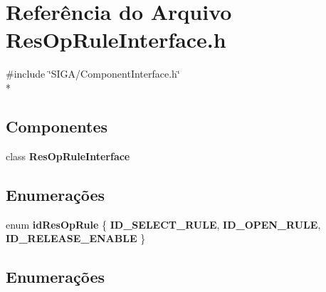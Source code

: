 \section{Referência do Arquivo Res\+Op\+Rule\+Interface.\+h}
\label{_rule_2_res_op_rule_interface_8h}
{\ttfamily \#include \char`\"{}S\+I\+G\+A/\+Component\+Interface.\+h\char`\"{}}\\*
\subsection*{Componentes}
\begin{DoxyCompactItemize}
\item 
class {\bf Res\+Op\+Rule\+Interface}
\end{DoxyCompactItemize}
\subsection*{Enumerações}
\begin{DoxyCompactItemize}
\item 
enum {\bf id\+Res\+Op\+Rule} \{ {\bf I\+D\+\_\+\+S\+E\+L\+E\+C\+T\+\_\+\+R\+U\+LE}, 
{\bf I\+D\+\_\+\+O\+P\+E\+N\+\_\+\+R\+U\+LE}, 
{\bf I\+D\+\_\+\+R\+E\+L\+E\+A\+S\+E\+\_\+\+E\+N\+A\+B\+LE}
 \}
\end{DoxyCompactItemize}


\subsection{Enumerações}
